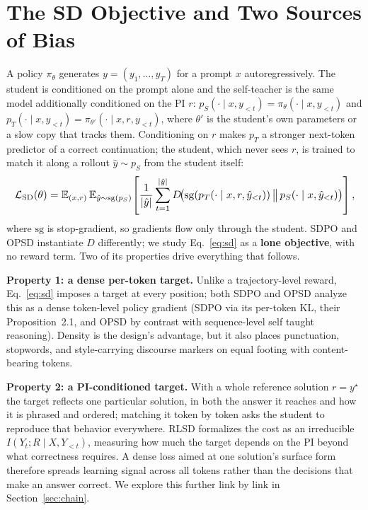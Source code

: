 \documentclass{article}
\newcommand{\ysol}{y^{\star}}               %
\begin{document}
\section{The SD Objective and Two Sources of Bias}
\label{sec:objective}

A policy $\pi_\theta$ generates $y=(y_1,\dots,y_T)$ for a prompt $x$ autoregressively. The student is conditioned on the prompt alone and the self-teacher is the same model additionally conditioned on the PI $r$: $p_S(\cdot\mid x,y_{<t})=\pi_\theta(\cdot\mid x,y_{<t})$ and $p_T(\cdot\mid x,y_{<t})=\pi_{\theta'}(\cdot\mid x,r,y_{<t})$, where $\theta'$ is the student's own parameters or a slow copy that tracks them. Conditioning on $r$ makes $p_T$ a stronger next-token predictor of a correct continuation; the student, which never sees $r$, is trained to match it along a rollout $\hat y\sim p_S$ from the student itself:
\begin{equation}
\resizebox{\linewidth}{!}{$\displaystyle
\mathcal{L}_{\mathrm{SD}}(\theta)=\mathbb{E}_{(x,r)}\,\mathbb{E}_{\hat y\sim \mathrm{sg}(p_S)}\!\left[\frac{1}{|\hat y|}\sum_{t=1}^{|\hat y|} D\!\big(\mathrm{sg}(p_T(\cdot\mid x,r,\hat y_{<t}))\,\big\|\,p_S(\cdot\mid x,\hat y_{<t})\big)\right],
$}
\label{eq:sd}
\end{equation}
where $\mathrm{sg}$ is stop-gradient, so gradients flow only through the student. SDPO and OPSD instantiate $D$ differently; we study Eq.~\eqref{eq:sd} as a \textbf{lone objective}, with no reward term. Two of its properties drive everything that follows.

\textbf{Property 1: a dense per-token target.} Unlike a trajectory-level reward, Eq.~\eqref{eq:sd} imposes a target at every position; both SDPO and OPSD analyze this as a dense token-level policy gradient (SDPO via its per-token KL, their Proposition~2.1, and OPSD by contrast with sequence-level self taught reasoning). Density is the design's advantage, but it also places punctuation, stopwords, and style-carrying discourse markers on equal footing with content-bearing tokens.

\textbf{Property 2: a PI-conditioned target.} With a whole reference solution $r=\ysol$ the target reflects one particular solution, in both the answer it reaches and how it is phrased and ordered; matching it token by token asks the student to reproduce that behavior everywhere. RLSD \citep{rlsd2025} formalizes the cost as an irreducible $I(Y_t;R\mid X,Y_{<t})$, measuring how much the target depends on the PI beyond what correctness requires. A dense loss aimed at one solution's surface form therefore spreads learning signal across all tokens rather than the decisions that make an answer correct. We explore this further link by link in Section~\ref{sec:chain}.
\end{document}

